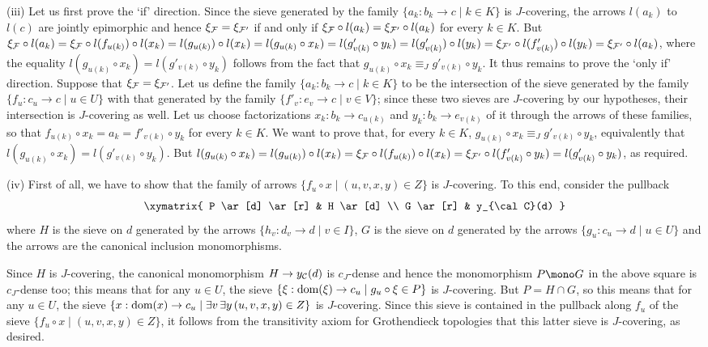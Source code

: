 \documentclass[a4paper,12pt]{article}
\begin{document}
\begin{proofs}
	(iii) Let us first prove the `if' direction. Since the sieve generated by the family  $\{a_{k}:b_{k}\to c \mid k\in K\}$ is $J$-covering, the arrows $l(a_{k})$ to $l(c)$ are jointly epimorphic and hence $\xi_{\cal F}=\xi_{{\cal F}'}$ if and only if $\xi_{\cal F}\circ l(a_{k})=\xi_{{\cal F}'}\circ l(a_{k})$ for every $k\in K$. But $\xi_{\cal F}\circ l(a_{k})=\xi_{\cal F} \circ l(f_{u(k)})\circ l(x_{k})= l(g_{u(k)})\circ l(x_{k})=l(g_{u(k)}\circ x_{k})=l(g'_{v(k)}\circ y_{k})=l(g'_{v(k)})\circ l(y_{k})=\xi_{{\cal F}'}\circ l(f'_{v(k)})\circ l(y_{k})=\xi_{{\cal F}'}\circ l(a_{k})$, where the equality $l(g_{u(k)}\circ x_{k})=l(g'_{v(k)}\circ y_{k})$ follows from the fact that $g_{u(k)}\circ x_{k}\equiv_{J} g'_{v(k)}\circ y_{k}$. It thus remains to prove the `only if' direction. Suppose that $\xi_{\cal F}=\xi_{{\cal F}'}$. Let us define the family $\{a_{k}:b_{k}\to c \mid k\in K\}$ to be the intersection of the sieve generated by the family $\{f_{u}:c_{u}\to c \mid u\in U\}$ with that generated by the family $\{f'_{v}:e_{v}\to c \mid v\in V\}$; since these two sieves are $J$-covering by our hypotheses, their intersection is $J$-covering as well. Let us choose factorizations $x_{k}:b_{k}\to c_{u(k)}$ and $y_{k}:b_{k}\to e_{v(k)}$ of it through the arrows of these families, so that $f_{u(k)}\circ x_{k}=a_{k}=f'_{v(k)}\circ y_{k}$ for every $k\in K$. We want to prove that, for every $k\in K$, $g_{u(k)}\circ x_{k}\equiv_{J} g'_{v(k)}\circ y_{k}$, equivalently that $l(g_{u(k)}\circ x_{k})=l(g'_{v(k)}\circ y_{k})$. But $l(g_{u(k)}\circ x_{k})=l(g_{u(k)})\circ l(x_{k})=\xi_{\cal F}\circ l(f_{u(k)})\circ l(x_{k})=\xi_{{\cal F}'}\circ l(f'_{v(k)}\circ y_{k})=l(g'_{v(k)}\circ y_{k})$, as required.
	
	(iv) First of all, we have to show that the family of arrows $\{f_{u}\circ x \mid (u,v,x,y )\in Z\}$ is $J$-covering. To this end, consider the pullback
	$$
	\xymatrix{
		P \ar[d] \ar[r] & H \ar[d]  \\
		G \ar[r]  & y_{\cal C}(d)
	} 
	$$
	where $H$ is the sieve on $d$ generated by the arrows $\{h_{v}:d_{v}\to d \mid v\in I\}$, $G$ is the sieve on $d$ generated by the arrows $\{g_{u}:c_{u}\to d \mid u\in U\}$ and the arrows are the canonical inclusion monomorphisms.
	
	Since $H$ is $J$-covering, the canonical monomorphism $H\to y_{\cal C}(d)$ is $c_{J}$-dense and hence the monomorphism $P\mono G$ in the above square is $c_{J}$-dense too; this means that for any $u\in U$, the sieve $\{\xi:\textup{dom}(\xi)\to c_{u} \mid g_{u}\circ \xi\in P\}$ is $J$-covering. But $P=H\cap G$, so this means that for any $u\in U$, the sieve $\{x:\textup{dom}(x)\to c_{u} \mid \exists v\,\exists y\,(u,v,x,y)\in Z\}$ is $J$-covering. Since this sieve is contained in the pullback along $f_{u}$ of the sieve $\{f_{u}\circ x \mid (u,v,x,y )\in Z\}$, it follows from the transitivity axiom for Grothendieck topologies that this latter sieve is $J$-covering, as desired. 
	

\end{proofs}
\end{document}
